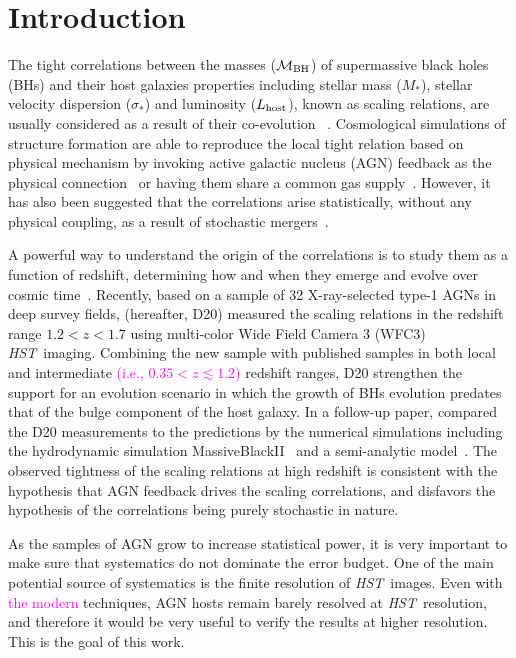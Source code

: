 \documentclass[fleqn,usenatbib]{mnras}
\newcommand{\hst}{{\it HST}}
\newcommand{\mbh}{$\mathcal M_{\rm BH}$}
\newcommand{\lhost}{$L_{\rm host}$}
\newcommand{\mstar}{{$M_*$}}
\newcommand{\pink}[1]{{\textcolor{magenta}{#1}}}
\begin{document}
\section{Introduction}
The tight correlations between the masses (\mbh) of supermassive black holes (BHs) and their host galaxies properties including stellar mass (\mstar), stellar velocity dispersion ($\sigma_*$) and luminosity (\lhost), known as scaling relations, are usually considered as a result of their co-evolution ~\citep[e.g.,][]{Mag++98, F+M00, Geb++01b, M+H03, Gul++09,Beifi2012, H+R04, Gra++2011}. Cosmological simulations of structure formation are able to reproduce the local tight relation based on physical mechanism by invoking active galactic nucleus (AGN) feedback as the physical connection~\citep{Springel2005, Hopkins2008, Matteo2008, DeG++15} or having them share a common gas supply~\citep{Cen2015, Menci2016}. However, it has also been suggested that the correlations arise statistically, without any physical coupling, as a result of stochastic mergers~\citep{Peng2007, Jahnke2011, Hirschmann2010}. 

A powerful way to understand the origin of the correlations is to study them as a function of redshift, determining how and when they emerge and evolve over cosmic time~\citep[e.g.,][]{TMB04,Sal++06,Woo++06, Jah++09,SS13,Sun2015, Park15}. Recently, based on a sample of 32 X-ray-selected type-1 AGNs in deep survey fields, \citet{Ding2020a} (hereafter, D20) measured the scaling relations in the redshift range $1.2<z<1.7$ using multi-color Wide Field Camera 3 (WFC3) \hst\ imaging. Combining the new sample with published samples in both local and intermediate \pink{(i.e., $0.35<z\lesssim1.2$)} redshift ranges, D20 strengthen the support for an evolution scenario in which the growth of BHs evolution predates that of  the bulge component of the host galaxy. In a follow-up paper, \citet{Ding2020b} compared the D20 measurements to the predictions by the numerical simulations including the hydrodynamic simulation MassiveBlackII~\citep{Khandai2015} and a semi-analytic model~\citep{Menci2014}. The observed tightness of the  scaling relations at high redshift is consistent with the hypothesis that AGN feedback drives the scaling correlations, and disfavors the hypothesis of the correlations being purely stochastic in nature. 

As the samples of AGN grow to increase statistical power, it is very important to make sure that systematics do not dominate the error budget. One of the main potential source of systematics is the finite resolution of \hst\ images. Even with \pink{the modern} techniques, AGN hosts remain barely resolved at \hst\ resolution, and therefore it would be very useful to verify the results at higher resolution. This is the goal of this work.
\end{document}
